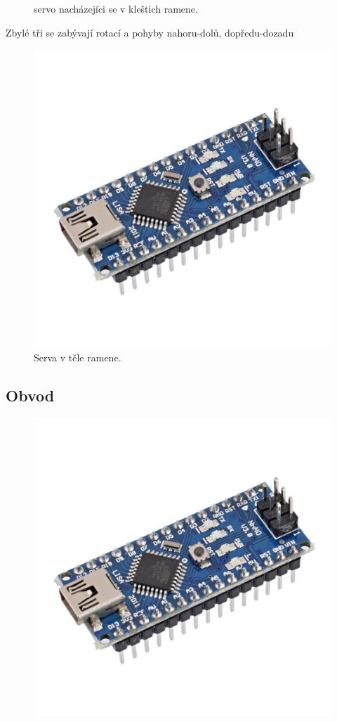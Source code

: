 \documentclass[12pt, a4paper,
twoside,        %
openright
]{report}
\begin{document}
{\begin{figure}[h]
	\caption{servo nacházejíci se v kleštich ramene\cite{servo-kleste}.} %
	\label{fig:servo-kleste} %
\end{figure}

	Zbylé tři se zabývají rotací a pohyby nahoru-dolů, dopředu-dozadu

\begin{figure}[h]
	
	\centering
	\includegraphics[width=0.3\linewidth]{image/arduino.jpg} 
	
	\caption{Serva v těle ramene\cite{serva}.} %
	\label{fig:serva} %
\end{figure}

\newpage

\subsection{Obvod}

\begin{figure}[h]
	
	\centering
	\includegraphics[width=0.9\linewidth]{image/arduino.jpg} 
	

\end{figure}}
\end{document}
